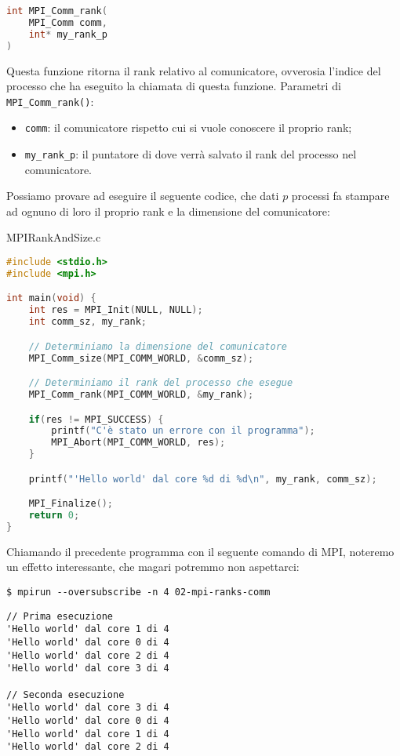 \begin{codedefine}
    \begin{lstlisting}[language = C, numbers = none]
int MPI_Comm_rank(
    MPI_Comm comm,
    int* my_rank_p
)\end{lstlisting}
    \manlower
    Questa funzione ritorna il rank relativo al comunicatore, ovverosia l'indice del processo che ha eseguito la chiamata di questa funzione.
    \nwl
    Parametri di \verb|MPI_Comm_rank()|:
    \begin{itemize}
        \item \verb|comm|: il comunicatore rispetto cui si vuole conoscere il proprio rank;
        \item \verb|my_rank_p|: il puntatore di dove verrà salvato il rank del processo nel comunicatore.
    \end{itemize}
\end{codedefine}

Possiamo provare ad eseguire il seguente codice, che dati $p$ processi fa stampare ad ognuno di loro il proprio rank e la dimensione del comunicatore:

\begin{codeblock}{MPIRankAndSize.c}
    \begin{lstlisting}[language = C]
#include <stdio.h>
#include <mpi.h>

int main(void) {
    int res = MPI_Init(NULL, NULL);
    int comm_sz, my_rank;

    // Determiniamo la dimensione del comunicatore
    MPI_Comm_size(MPI_COMM_WORLD, &comm_sz);

    // Determiniamo il rank del processo che esegue
    MPI_Comm_rank(MPI_COMM_WORLD, &my_rank);

    if(res != MPI_SUCCESS) {
        printf("C'è stato un errore con il programma");
        MPI_Abort(MPI_COMM_WORLD, res);
    }

    printf("'Hello world' dal core %d di %d\n", my_rank, comm_sz);

    MPI_Finalize();
    return 0;
}
    \end{lstlisting}
\end{codeblock}

Chiamando il precedente programma con il seguente comando di MPI, noteremo un effetto interessante, che magari potremmo non aspettarci:

\begin{terminal}
    \begin{lstlisting}[style = notexterm]
 $ mpirun --oversubscribe -n 4 02-mpi-ranks-comm
    \end{lstlisting}
    \begin{tcolorbox}
        \begin{lstlisting}[basewidth=0.44em, numbers=none]
// Prima esecuzione
'Hello world' dal core 1 di 4
'Hello world' dal core 0 di 4
'Hello world' dal core 2 di 4
'Hello world' dal core 3 di 4

// Seconda esecuzione
'Hello world' dal core 3 di 4
'Hello world' dal core 0 di 4
'Hello world' dal core 1 di 4
'Hello world' dal core 2 di 4\end{lstlisting}
    \end{tcolorbox}
\end{terminal}

